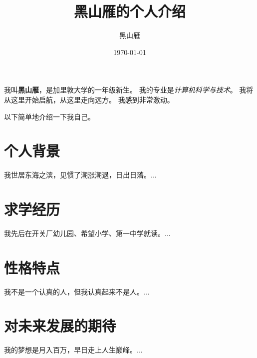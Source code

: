 \documentclass[12pt,a4paper]{article}
\title{黑山雁的个人介绍}
\author{黑山雁}
\date{\today}
\begin{document}
\maketitle
我叫\textbf{黑山雁}，是加里敦大学的一年级新生。
我的专业是\textit{计算机科学与技术}。
我将从这里开始启航，从这里走向远方。
我感到非常激动。



以下简单地介绍一下我自己。
\section{个人背景}
我世居东海之滨，见惯了潮涨潮退，日出日落。...
\section{求学经历}
我先后在开关厂幼儿园、希望小学、第一中学就读。...
\section{性格特点}
我不是一个认真的人，但我认真起来不是人。...
\section{对未来发展的期待}
我的梦想是月入百万，早日走上人生巅峰。...
\end{document}
